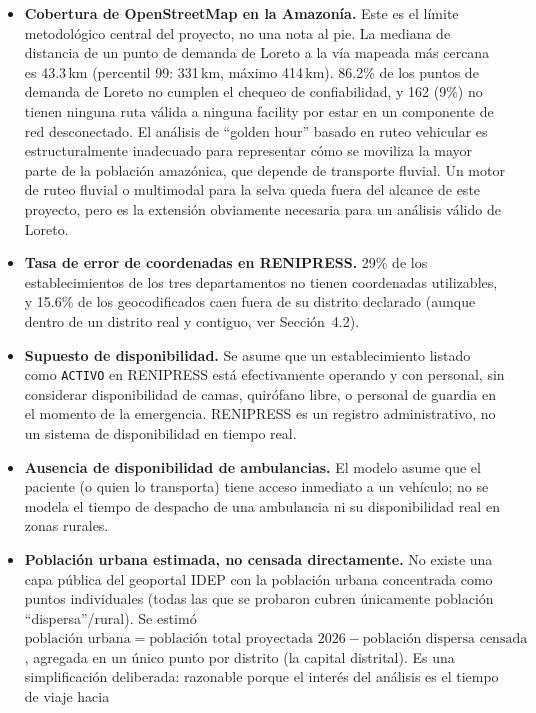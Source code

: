 \documentclass[11pt]{article}
\begin{document}
\begin{itemize}
  \item \textbf{Cobertura de OpenStreetMap en la Amazon\'ia.} Este es el
  l\'imite metodol\'ogico central del proyecto, no una nota al pie. La
  mediana de distancia de un punto de demanda de Loreto a la v\'ia mapeada
  m\'as cercana es 43.3\,km (percentil 99: 331\,km, m\'aximo 414\,km).
  86.2\% de los puntos de demanda de Loreto no cumplen el chequeo de
  confiabilidad, y 162 (9\%) no tienen ninguna ruta v\'alida a ninguna
  facility por estar en un componente de red desconectado. El an\'alisis
  de ``golden hour'' basado en ruteo vehicular es estructuralmente
  inadecuado para representar c\'omo se moviliza la mayor parte de la
  poblaci\'on amaz\'onica, que depende de transporte fluvial. Un motor de
  ruteo fluvial o multimodal para la selva queda fuera del alcance de
  este proyecto, pero es la extensi\'on obviamente necesaria para un
  an\'alisis v\'alido de Loreto.
  \item \textbf{Tasa de error de coordenadas en RENIPRESS.} 29\% de los
  establecimientos de los tres departamentos no tienen coordenadas
  utilizables, y 15.6\% de los geocodificados caen fuera de su distrito
  declarado (aunque dentro de un distrito real y contiguo, ver
  Secci\'on~4.2).
  \item \textbf{Supuesto de disponibilidad.} Se asume que un
  establecimiento listado como \texttt{ACTIVO} en RENIPRESS est\'a
  efectivamente operando y con personal, sin considerar disponibilidad de
  camas, quir\'ofano libre, o personal de guardia en el momento de la
  emergencia. RENIPRESS es un registro administrativo, no un sistema de
  disponibilidad en tiempo real.
  \item \textbf{Ausencia de disponibilidad de ambulancias.} El modelo
  asume que el paciente (o quien lo transporta) tiene acceso inmediato a
  un veh\'iculo; no se modela el tiempo de despacho de una ambulancia ni
  su disponibilidad real en zonas rurales.
  \item \textbf{Poblaci\'on urbana estimada, no censada directamente.} No
  existe una capa p\'ublica del geoportal IDEP con la poblaci\'on urbana
  concentrada como puntos individuales (todas las que se probaron cubren
  \'unicamente poblaci\'on ``dispersa''/rural). Se estim\'o
  $\text{poblaci\'on urbana} = \text{poblaci\'on total proyectada 2026} -
  \text{poblaci\'on dispersa censada}$, agregada en un \'unico punto por
  distrito (la capital distrital). Es una simplificaci\'on deliberada:
  razonable porque el inter\'es del an\'alisis es el tiempo de viaje hacia

\end{itemize}
\end{document}
